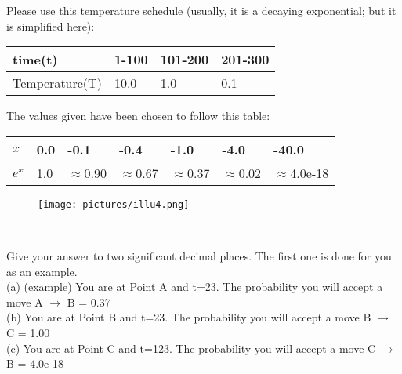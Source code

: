 \documentclass{article}
\begin{document}
Please use this temperature schedule (usually, it is a decaying exponential; but it is simplified here):
\renewcommand\arraystretch{1.5}
\begin{table}[tbh!]
\begin{center}
    \begin{tabular}{|p{2.5cm}| p{1.5cm}| p{1.5cm} | p{1.5cm}|}
\hline
    time(t) & 1-100 & 101-200 & 201-300  \\ \hline
    Temperature(T) & 10.0 & 1.0 & 0.1  \\ \hline
\end{tabular}
\end{center}
\end{table}

The values given have been chosen to follow this table:
\renewcommand\arraystretch{1.5}
\begin{table}[tbh!]
\begin{center}
    \begin{tabular}{|p{2.5cm}| p{1.5cm}| p{1.5cm} | p{1.5cm}|p{1.5cm}| p{1.5cm} | p{1.5cm}|}
\hline
    $x$ & 0.0 & -0.1 & -0.4               &-1.0       &-4.0        &-40.0\\ \hline
    $e^x$ & 1.0 & $\approx$0.90 & $\approx$0.67 &$\approx$0.37 & $\approx$0.02  & $\approx$4.0e-18\\ \hline
\end{tabular}
\end{center}
\end{table}

\begin{figure}[h]
\centering
\texttt{[image: pictures/illu4.png]}
\end{figure}
~\\

\newpage

\noindent Give your answer to two significant decimal places. The first one is done for you as an example. \\


\noindent (a) (example) You are at Point A and t=23. The probability you will accept a move A $\to$ B = 0.37  \\

\noindent (b)  You are at Point B and t=23. The probability you will accept a move B $\to$ C = 1.00  \\

\noindent (c) You are at Point C and t=123. The probability you will accept a move C $\to$ B = 4.0e-18 \\
\end{document}
